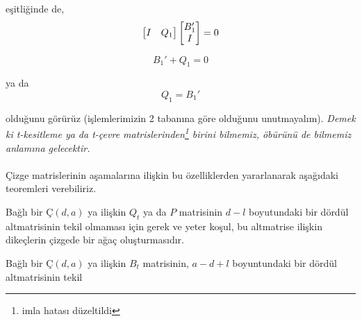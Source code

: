 \documentclass[11pt]{amsbook}
\begin{document}

eşitliğinde de,
\begin{equation*}
	\begin{bmatrix}
		I & Q_{1}
	\end{bmatrix} 
	\begin{bmatrix}
		B_{1}' \\
		I
	\end{bmatrix}
	= 0 \\
\end{equation*}

\begin{equation*}
	B_{1}' + Q_{1} = 0
\end{equation*}

ya da
\begin{equation*}
	Q_{1} = B_{1}'
\end{equation*}

olduğunu görürüz (işlemlerimizin 2 tabanına göre olduğunu unutmayalım). \textit{Demek ki t-kesitleme ya da t-çevre matrislerinden\footnote{imla hatası düzeltildi} birini bilmemiz, öbürünü de bilmemiz anlamına gelecektir.} \\ \\
Çizge matrislerinin aşamalarına ilişkin bu özelliklerden yararlanarak aşağıdaki teoremleri verebiliriz. \\

\begin{theorem}
	Bağlı bir $Ç(d,a)$ ya ilişkin $Q_{t}$ ya da $P$ matrisinin $d - l$ boyutundaki bir dördül altmatrisinin tekil olmaması için gerek ve yeter koşul, bu altmatrise ilişkin dikeçlerin çizgede bir ağaç oluşturmasıdır.\\
\end{theorem}

\begin{theorem}
	Bağlı bir $Ç(d,a)$ ya ilişkin $B_{t}$ matrisinin, $a - d + l$ boyuntundaki bir dördül altmatrisinin tekil
\end{theorem}
\end{document}
